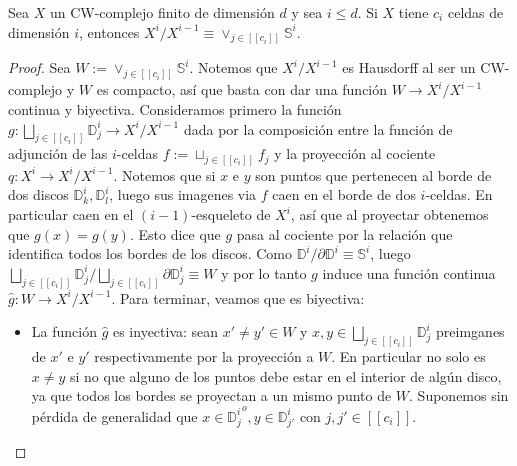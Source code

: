 \documentclass[11pt]{article}
\newcommand{\D}{\mathbb{D}}
\newcommand{\Ss}{\mathbb{S}}
\newcommand{\tint}[1]{#1^o}
\newcommand{\nat}[1]{[\![#1]\!]}
\newcommand{\paint}[1]{\color{color}{#1}}
\newenvironment{lemma}[2][Lema]{\begin{trivlist}
\item[\hskip \labelsep \paint{{\bfseries #1}}\hskip \labelsep {\bfseries #2.}]}{\end{trivlist}}
\begin{document}
\begin{lemma}{2} Sea $X$ un CW-complejo finito de dimensi\'on $d$ y sea $i \leq d$. Si $X$ tiene $c_i$ celdas de dimensi\'on $i$, entonces $X^i/X^{i-1} \equiv \vee_{j \in \nat{c_i}}\Ss^i$.
\end{lemma}
\begin{proof} Sea $W := \vee_{j \in \nat{c_i}}\Ss^i$. Notemos que $X^i/X^{i-1}$ es Hausdorff al ser un CW-complejo y $W$ es compacto, as\'i que basta con dar una funci\'on $W \to X^i/X^{i-1}$ continua y biyectiva. Consideramos primero la funci\'on $g : \bigsqcup_{j \in \nat{c_i}}\D^i_j \to X^i/X^{i-1}$ dada por la composici\'on entre la funci\'on de adjunci\'on de las $i$-celdas $f := \sqcup_{j \in \nat{c_i}}f_j$ y la proyecci\'on al cociente $q : X^i \to X^i/X^{i-1}$. Notemos que si $x$ e $y$ son puntos que pertenecen al borde de dos discos $\D^i_k, \D^i_l$, luego sus imagenes via $f$ caen en el borde de dos $i$-celdas. En particular caen en el $(i-1)$-esqueleto de $X^i$, as\'i que al proyectar obtenemos que $g(x) = g(y)$. Esto dice que $g$ pasa al cociente por la relaci\'on que identifica todos los bordes de los discos. Como $\D^i/\partial \D^i \equiv \Ss^i$, luego $\bigsqcup_{j \in \nat{c_i}}\D^i_j/\bigsqcup_{j \in \nat{c_i}} \partial\D_j^i \equiv W$ y por lo tanto $g$ induce una funci\'on continua $\hat{g} : W \to X^i/X^{i-1}$. Para terminar, veamos que es biyectiva: 
\begin{itemize}
\item[$\bullet$] La funci\'on $\hat{g}$ es inyectiva: sean $x' \neq y' \in W$ y $x,y \in \bigsqcup_{j \in \nat{c_i}}\D^i_j$ preimganes de $x'$ e $y'$ respectivamente por la proyecci\'on a $W$. En particular no solo es $x \neq y$ si no que alguno de los puntos debe estar en el interior de alg\'un disco, ya que todos los bordes se proyectan a un mismo punto de $W$. Suponemos sin p\'erdida de generalidad que $x \in \tint{{\D^i_j}}, y \in \D^i_{j'}$ con $j,j' \in \nat{c_i}$. 


\end{itemize}
\end{proof}
\end{document}
